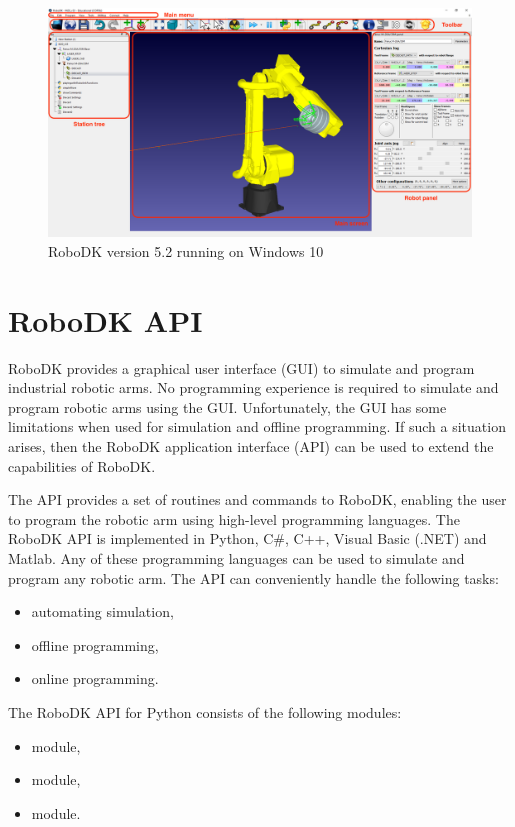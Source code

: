 \begin{figure}[h]
    \centering
    \includegraphics[width=0.9\linewidth]{img/robodk_interface_v_2.png}
    \caption{RoboDK version 5.2 running on Windows 10}
    \label{fig:robodkinterface}
\end{figure}

\section{RoboDK API}

RoboDK provides a graphical user interface (GUI) to simulate and program industrial robotic arms. No programming experience is required to simulate and program robotic arms using the GUI. Unfortunately, the GUI has some limitations when used for simulation and offline programming. If such a situation arises, then the RoboDK application interface (API) can be used to extend the capabilities of RoboDK.

The API provides a set of routines and commands to RoboDK, enabling the user to program the robotic arm using high-level programming languages. The RoboDK API is implemented in Python, C\#, C++, Visual Basic (.NET) and Matlab. Any of these programming languages can be used to simulate and program any robotic arm. The API can conveniently handle the following tasks:

\begin{itemize}
    \item automating simulation,
    \item offline programming,
    \item online programming.

\end{itemize}

The RoboDK API for Python consists of the following modules:


\begin{itemize}
    \item {} module, 
    \item {} module, 
    \item {} module.
\end{itemize}

